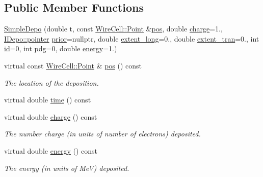 \subsection*{Public Member Functions}
\begin{DoxyCompactItemize}
\item 
\hyperlink{class_wire_cell_1_1_simple_depo_a9cd203c648b15f9213979a054a8696c5}{Simple\+Depo} (double t, const \hyperlink{namespace_wire_cell_ab2b2565fa6432efbb4513c14c988cda9}{Wire\+Cell\+::\+Point} \&\hyperlink{class_wire_cell_1_1_simple_depo_ab41e2325f1fdff081ef6724389419529}{pos}, double \hyperlink{class_wire_cell_1_1_simple_depo_a07e9a03fcc18207e8e55ac3ed201828c}{charge}=1., \hyperlink{class_wire_cell_1_1_i_data_aff870b3ae8333cf9265941eef62498bc}{I\+Depo\+::pointer} \hyperlink{class_wire_cell_1_1_simple_depo_a23c734fee4ed0184b032e99a193f6f8e}{prior}=nullptr, double \hyperlink{class_wire_cell_1_1_simple_depo_aebb13d9a9c5a5bc0f821d2e690c88c46}{extent\+\_\+long}=0., double \hyperlink{class_wire_cell_1_1_simple_depo_ac03d9904acf5117c23c363c7168310cd}{extent\+\_\+tran}=0., int \hyperlink{class_wire_cell_1_1_simple_depo_a30d9b06e6e65bba3d0b4fa17f64c52f5}{id}=0, int \hyperlink{class_wire_cell_1_1_simple_depo_a632331ca715c30e2600b2b115139fb0d}{pdg}=0, double \hyperlink{class_wire_cell_1_1_simple_depo_acea11f65dc7accc767a196963d93cd02}{energy}=1.)
\item 
virtual const \hyperlink{namespace_wire_cell_ab2b2565fa6432efbb4513c14c988cda9}{Wire\+Cell\+::\+Point} \& \hyperlink{class_wire_cell_1_1_simple_depo_ab41e2325f1fdff081ef6724389419529}{pos} () const
\begin{DoxyCompactList}\small\item\em The location of the deposition. \end{DoxyCompactList}\item 
virtual double \hyperlink{class_wire_cell_1_1_simple_depo_aadb43cf11d4612fcad2279b9a32d697a}{time} () const
\item 
virtual double \hyperlink{class_wire_cell_1_1_simple_depo_a07e9a03fcc18207e8e55ac3ed201828c}{charge} () const
\begin{DoxyCompactList}\small\item\em The number charge (in units of number of electrons) deposited. \end{DoxyCompactList}\item 
virtual double \hyperlink{class_wire_cell_1_1_simple_depo_acea11f65dc7accc767a196963d93cd02}{energy} () const
\begin{DoxyCompactList}\small\item\em The energy (in units of MeV) deposited. \end{DoxyCompactList}\item 

\end{DoxyCompactItemize}
